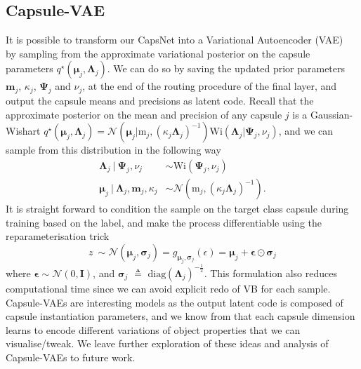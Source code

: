 \documentclass[letterpaper]{article} \usepackage{aaai20}  \usepackage{times}  \usepackage{helvet} \usepackage{courier}  \usepackage[hyphens]{url}  \usepackage{graphicx} \urlstyle{rm} \def\UrlFont{\rm}  \usepackage{graphicx}  \frenchspacing  \setlength{\pdfpagewidth}{8.5in}  \setlength{\pdfpageheight}{11in}  \nocopyright
\begin{document}
\subsection{Capsule-VAE}
It is possible to transform our CapsNet into a Variational Autoencoder (VAE)~\cite{kingma2013auto} by sampling from the approximate variational posterior on the capsule parameters $q^{\star}(\boldsymbol{\mu}_j, \boldsymbol{\Lambda}_j)$. We can do so by saving the updated prior parameters $\mathbf{m}_j$, $\kappa_j$, $\boldsymbol{\Psi}_j$ and $\nu_j$, at the end of the routing procedure of the final layer, and output the capsule means and precisions as latent code. Recall that the approximate posterior on the mean and precision of any capsule $j$ is a Gaussian-Wishart $q^{\star}(\boldsymbol{\mu}_j, \boldsymbol{\Lambda}_j) = \mathcal{N}(\boldsymbol{\mu}_j|\boldsymbol{\mathrm{m}}_j, (\kappa_j \boldsymbol{\Lambda}_j)^{-1})\mathrm{Wi}(\boldsymbol{\Lambda}_j|\boldsymbol{\Psi}_{j},\nu_{j})$, and we can sample from this distribution in the following way
\begin{equation}
\begin{aligned}
    \boldsymbol{\Lambda}_j \ | \ \boldsymbol{\Psi}_j, \nu_j \ &\sim  \mathrm{Wi}(\boldsymbol{\Psi}_{j},\nu_{j}) \\
    \boldsymbol{\mu}_j \ | \ \boldsymbol{\Lambda}_j, \mathbf{m}_j, \kappa_j &\sim \mathcal{N}(\boldsymbol{\mathrm{m}}_j, (\kappa_j \boldsymbol{\Lambda}_j)^{-1}).
\end{aligned}
\end{equation}
It is straight forward to condition the sample on the target class capsule during training based on the label, and make the process differentiable using the reparameterisation trick
\begin{equation}
    z \ \sim \mathcal{N}(\boldsymbol{\mu}_j, \boldsymbol{\sigma}_j) = g_{\boldsymbol{\mu}_j,\boldsymbol{\sigma}_j}(\epsilon) = \boldsymbol{\mu}_j + \boldsymbol{\epsilon} \odot \boldsymbol{\sigma}_j
\end{equation}
where $\boldsymbol{\epsilon} \sim \mathcal{N}(0, \mathbf{I})$, and $\boldsymbol{\sigma}_j$ $\triangleq$ $\mathrm{diag}(\boldsymbol{\Lambda}_j)^{- \frac{1}{2}}$. This formulation also reduces computational time since we can avoid explicit redo of VB for each sample. Capsule-VAEs are interesting models as the output latent code is composed of capsule instantiation parameters, and we know from \cite{sabour2017dynamic} that each capsule dimension learns to encode different variations of object properties that we can visualise/tweak. We leave further exploration of these ideas and analysis of Capsule-VAEs to future work.
\end{document}
